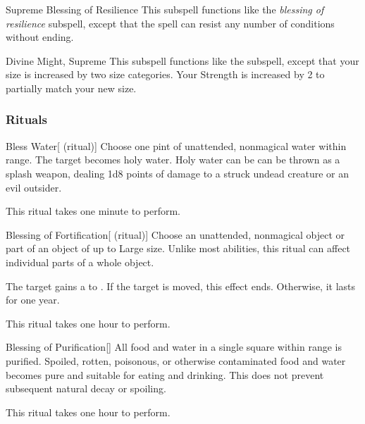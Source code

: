 \begin{ability}[\nth{5}]{Supreme Blessing of Resilience}
This subspell functions like the \textit{blessing of resilience} subspell, except that the spell can resist any number of conditions without ending.
\end{ability}
\vspace{0.25em}



\begin{ability}[\nth{7}]{Divine Might, Supreme}
This subspell functions like the  subspell, except that your size is increased by two size categories.
Your Strength is increased by 2 to partially match your new size.
\end{ability}
\vspace{0.25em}



\subsubsection{Rituals}


\begin{ability}[\nth{1}]{Bless Water}[ (ritual)]
Choose one pint of unattended, nonmagical water within \rngclose range.
The target becomes holy water.
Holy water can be can be thrown as a splash weapon, dealing 1d8 points of damage to a struck undead creature or an evil outsider.

This ritual takes one minute to perform.
\end{ability}
\vspace{0.25em}



\begin{ability}[\nth{1}]{Blessing of Fortification}[ (ritual)]
Choose an unattended, nonmagical object or part of an object of up to Large size.
Unlike most abilities, this ritual can affect individual parts of a whole object.

The target gains a   to .
If the target is moved, this effect ends.
Otherwise, it lasts for one year.

This ritual takes one hour to perform.
\end{ability}
\vspace{0.25em}



\begin{ability}[\nth{1}]{Blessing of Purification}[]
All food and water in a single square within \rngclose range is purified.
Spoiled, rotten, poisonous, or otherwise contaminated food and water becomes pure and suitable for eating and drinking.
This does not prevent subsequent natural decay or spoiling.

This ritual takes one hour to perform.
\end{ability}
\vspace{0.25em}



